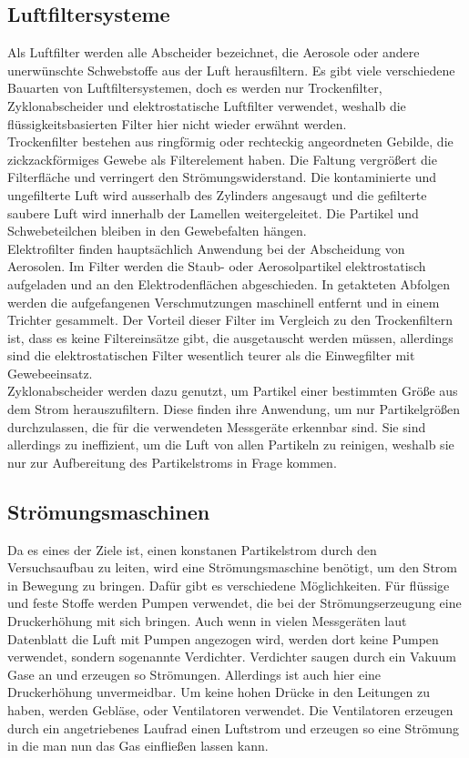 \subsection{Luftfiltersysteme}
Als Luftfilter werden alle Abscheider bezeichnet, die Aerosole oder andere unerw\"{u}nschte Schwebstoffe aus der Luft herausfiltern. Es gibt viele verschiedene Bauarten von Luftfiltersystemen, doch es werden nur Trockenfilter, Zyklonabscheider und elektrostatische Luftfilter verwendet, weshalb die fl\"{u}ssigkeitsbasierten Filter hier nicht wieder erw\"{a}hnt werden. \\
Trockenfilter bestehen aus ringf\"{o}rmig oder rechteckig angeordneten Gebilde, die zickzackf\"{o}rmiges Gewebe als Filterelement haben. Die Faltung vergr\"{o}{\ss}ert die Filterfl\"{a}che und verringert den Str\"{o}mungswiderstand. Die kontaminierte und ungefilterte Luft wird ausserhalb des Zylinders angesaugt und die gefilterte saubere Luft wird innerhalb der Lamellen weitergeleitet. Die Partikel und Schwebeteilchen bleiben in den Gewebefalten h\"{a}ngen.\\
Elektrofilter finden haupts\"{a}chlich Anwendung bei der Abscheidung von Aerosolen. Im Filter werden die Staub- oder Aerosolpartikel elektrostatisch aufgeladen und an den Elektrodenfl\"{a}chen abgeschieden. In getakteten Abfolgen werden die aufgefangenen Verschmutzungen maschinell entfernt und in einem Trichter gesammelt. Der Vorteil dieser Filter im Vergleich zu den Trockenfiltern ist, dass es keine Filtereins\"{a}tze gibt, die ausgetauscht werden m\"{u}ssen, allerdings sind die elektrostatischen Filter wesentlich teurer als die Einwegfilter mit Gewebeeinsatz.\\
Zyklonabscheider werden dazu genutzt, um Partikel einer bestimmten Gr\"{o}{\ss}e aus dem Strom herauszufiltern. Diese finden ihre Anwendung, um nur Partikelgr\"{o}{\ss}en durchzulassen, die f\"{u}r die verwendeten Messger\"{a}te erkennbar sind. Sie sind allerdings zu ineffizient, um die Luft von allen Partikeln zu reinigen, weshalb sie nur zur Aufbereitung des Partikelstroms in Frage kommen\cite{filter}.

\subsection{Str\"{o}mungsmaschinen}
Da es eines der Ziele ist, einen konstanen Partikelstrom durch den Versuchsaufbau zu leiten, wird eine Str\"{o}mungsmaschine ben\"{o}tigt, um den Strom in Bewegung zu bringen. Daf\"{u}r gibt es verschiedene M\"{o}glichkeiten. F\"{u}r fl\"{u}ssige und feste Stoffe werden Pumpen verwendet, die bei der Str\"{o}mungserzeugung eine Druckerh\"{o}hung mit sich bringen. Auch wenn in vielen Messger\"{a}ten laut Datenblatt die Luft mit Pumpen angezogen wird, werden dort keine Pumpen verwendet, sondern sogenannte Verdichter. Verdichter saugen durch ein Vakuum Gase an und erzeugen so Str\"{o}mungen. Allerdings ist auch hier eine Druckerh\"{o}hung unvermeidbar. Um keine hohen Dr\"{u}cke in den Leitungen zu haben, werden Gebl\"{a}se, oder Ventilatoren verwendet. Die Ventilatoren erzeugen durch ein angetriebenes Laufrad einen Luftstrom und erzeugen so eine Str\"{o}mung in die man nun das Gas einflie{\ss}en lassen kann\cite{maschine}.